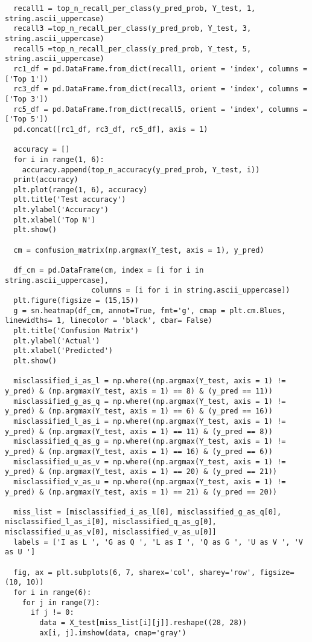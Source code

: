 \documentclass[12pt]{article}
\numberwithin{equation}{section}
\numberwithin{figure}{section}
\numberwithin{table}{section}
\begin{document}
\begin{lstlisting}
  recall1 = top_n_recall_per_class(y_pred_prob, Y_test, 1, string.ascii_uppercase)
  recall3 =top_n_recall_per_class(y_pred_prob, Y_test, 3, string.ascii_uppercase)
  recall5 =top_n_recall_per_class(y_pred_prob, Y_test, 5, string.ascii_uppercase)
  rc1_df = pd.DataFrame.from_dict(recall1, orient = 'index', columns = ['Top 1'])
  rc3_df = pd.DataFrame.from_dict(recall3, orient = 'index', columns = ['Top 3'])
  rc5_df = pd.DataFrame.from_dict(recall5, orient = 'index', columns = ['Top 5'])
  pd.concat([rc1_df, rc3_df, rc5_df], axis = 1)
  
  accuracy = []
  for i in range(1, 6):
    accuracy.append(top_n_accuracy(y_pred_prob, Y_test, i))
  print(accuracy)
  plt.plot(range(1, 6), accuracy)
  plt.title('Test accuracy')
  plt.ylabel('Accuracy')
  plt.xlabel('Top N')
  plt.show()
  
  cm = confusion_matrix(np.argmax(Y_test, axis = 1), y_pred)
  
  df_cm = pd.DataFrame(cm, index = [i for i in string.ascii_uppercase],
                    columns = [i for i in string.ascii_uppercase])
  plt.figure(figsize = (15,15))
  g = sn.heatmap(df_cm, annot=True, fmt='g', cmap = plt.cm.Blues, linewidths= 1, linecolor = 'black', cbar= False)
  plt.title('Confusion Matrix')
  plt.ylabel('Actual')
  plt.xlabel('Predicted')
  plt.show()
  
  misclassified_i_as_l = np.where((np.argmax(Y_test, axis = 1) != y_pred) & (np.argmax(Y_test, axis = 1) == 8) & (y_pred == 11))
  misclassified_g_as_q = np.where((np.argmax(Y_test, axis = 1) != y_pred) & (np.argmax(Y_test, axis = 1) == 6) & (y_pred == 16))
  misclassified_l_as_i = np.where((np.argmax(Y_test, axis = 1) != y_pred) & (np.argmax(Y_test, axis = 1) == 11) & (y_pred == 8))
  misclassified_q_as_g = np.where((np.argmax(Y_test, axis = 1) != y_pred) & (np.argmax(Y_test, axis = 1) == 16) & (y_pred == 6))
  misclassified_u_as_v = np.where((np.argmax(Y_test, axis = 1) != y_pred) & (np.argmax(Y_test, axis = 1) == 20) & (y_pred == 21))
  misclassified_v_as_u = np.where((np.argmax(Y_test, axis = 1) != y_pred) & (np.argmax(Y_test, axis = 1) == 21) & (y_pred == 20))
  
  miss_list = [misclassified_i_as_l[0], misclassified_g_as_q[0], misclassified_l_as_i[0], misclassified_q_as_g[0], misclassified_u_as_v[0], misclassified_v_as_u[0]]
  labels = ['I as L ', 'G as Q ', 'L as I ', 'Q as G ', 'U as V ', 'V as U ']
  
  fig, ax = plt.subplots(6, 7, sharex='col', sharey='row', figsize=(10, 10))
  for i in range(6):
    for j in range(7):
      if j != 0:
        data = X_test[miss_list[i][j]].reshape((28, 28))
        ax[i, j].imshow(data, cmap='gray')
        

\end{lstlisting}
\end{document}
